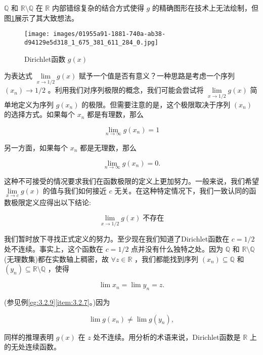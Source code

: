 \(\mathbb{Q}\) 和 \(\mathbb{R}\setminus \mathbb{Q}\) 在 \(\mathbb{R}\) 内部错综复杂的结合方式使得 \(g\) 的精确图形在技术上无法绘制，但图\ref{fig:4.1}展示了其大致想法。


\begin{figure}[h]
  \centering
  \texttt{[image: images/01955a91-1881-740a-ab38-d94129e5d318\_1\_675\_381\_611\_284\_0.jpg]}
  \caption{Dirichlet函数 \(g\left( x\right)\) }
  \label{fig:4.1}
\end{figure}


为表达式 \(\mathop{\lim }\limits_{{x \rightarrow  1/2}}g\left( x\right)\) 赋予一个值是否有意义？一种思路是考虑一个序列 \(\left( {x}_{n}\right)  \rightarrow  1/2\) 。利用我们对序列极限的概念，我们可能会尝试将 \(\mathop{\lim }\limits_{{x \rightarrow  1/2}}g\left( x\right)\) 简单地定义为序列 \(g\left( {x}_{n}\right)\) 的极限。但需要注意的是，这个极限取决于序列 \(\left( {x}_{n}\right)\) 的选择方式。如果每个 \({x}_{n}\) 都是有理数，那么

\[
\mathop{\lim }\limits_{{n \rightarrow  \infty }}g\left( {x}_{n}\right)  = 1
\]

另一方面，如果每个 \({x}_{n}\) 都是无理数，那么

\[
\mathop{\lim }\limits_{{n \rightarrow  \infty }}g\left( {x}_{n}\right)  = 0.
\]



这种不可接受的情况要求我们在函数极限的定义上更加努力。一般来说，我们希望 \(\mathop{\lim }\limits_{{x \rightarrow  c}}g\left( x\right)\) 的值与我们如何接近 \(c\) 无关。在这种特定情况下，我们一致认同的函数极限定义应得出以下结论:

\[
\mathop{\lim }\limits_{{x \rightarrow  1/2}}g\left( x\right) \;\text{不存在}
\]

我们暂时放下寻找正式定义的努力。至少现在我们知道了Dirichlet函数在 \(c = 1/2\) 处不连续。事实上，这个函数在 \(c = 1/2\) 点并没有什么独特之处。因为 \(\mathbb{Q}\) 和 \(\mathbb{R}\setminus\mathbb{Q}\) (无理数集)都在实数轴上稠密，故 \(\forall z \in  \mathbb{R}\) ，我们都能找到序列 \(\left( {x}_{n}\right)  \subseteq  \mathbb{Q}\) 和 \(\left( {y}_{n}\right)  \subseteq  \mathbb{R}\setminus\mathbb{Q}\) ，使得

\[
\lim {x}_{n} = \lim {y}_{n} = z.
\]

(参见例\ref{eg:3.2.9}\ref{item:3.2.7}。)因为

\[
\lim g\left( {x}_{n}\right)  \neq  \lim g\left( {y}_{n}\right) ,
\]

同样的推理表明 \(g\left( x\right)\) 在 \(z\) 处不连续。用分析的术语来说，Dirichlet函数是 \(\mathbb{R}\) 上的无处连续函数。



